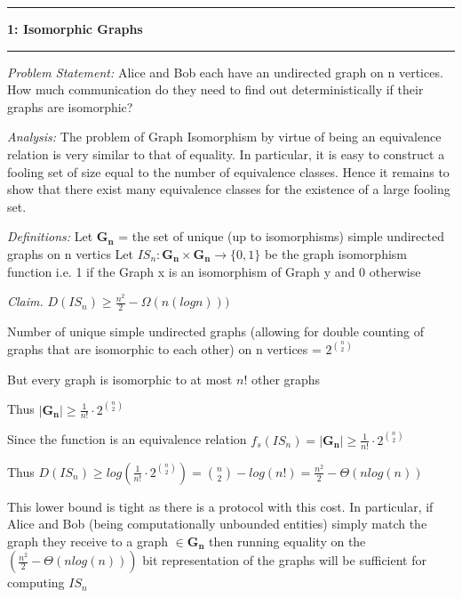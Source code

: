 \documentclass[11pt]{article}
\newcommand\question[2]{\vspace{.25in}\hrule\textbf{#1: #2}\vspace{.5em}\hrule\vspace{.10in}}
\newcommand\analysis{\vspace{.10in}\emph{Analysis: }\newline}
\newcommand\problem{\emph{Problem Statement:}\newline}
\newcommand\definitions{\emph{Definitions:}\newline}
\newcommand\claim{\emph{Claim.}\newline}
\begin{document}
\raggedright
\newcommand\NAME{Siddharth Joshi}  %
\newcommand\HWNUM{}              %


\question{1}{Isomorphic Graphs} 

\problem
Alice and Bob each have an undirected graph on n
vertices. How much communication do they need to find out deterministically if
their graphs are isomorphic?

\analysis
The problem of Graph Isomorphism by virtue of being an equivalence relation is very similar to that of equality. In particular, it is easy to construct a fooling set of size equal to the number of equivalence classes. Hence it remains to show that there exist many equivalence classes for the existence of a large fooling set. \newline

\definitions
Let $\mathbf{G_n}$ = the set of unique (up to isomorphisms) simple undirected graphs on n vertics \newline
Let $IS_n: \mathbf{G_n} \times \mathbf{G_n} \to \{0, 1\}$ be the graph isomorphism function i.e. 1 if the Graph x is an isomorphism of Graph y and 0 otherwise
\newline

\claim
$ D(IS_n) \geq \frac{n^2}{2} - \Omega(n(logn))) $

\proof 
Number of unique simple undirected graphs (allowing for double counting of graphs that are isomorphic to each other) on n vertices = $2^{n \choose 2}$

But every graph is isomorphic to at most $n!$ other graphs

Thus $\vert\mathbf{G_n}\vert \geq \frac{1}{n!} \cdot 2^{{n \choose 2}}$

Since the function is an equivalence relation $f_s(IS_n) = \vert\mathbf{G_n}\vert \geq \frac{1}{n!} \cdot 2^{{n \choose 2}}$

Thus $D(IS_n) \geq log( \frac{1}{n!} \cdot 2^{{n \choose 2}}) = {n \choose 2} - log(n!) = \frac{n^2}{2} - \Theta({nlog(n)})$

This lower bound is tight as there is a protocol with this cost. In particular, if Alice and Bob (being computationally unbounded entities) simply match the graph they receive to a graph $\in \mathbf{G_n}$ then running equality on the $(\frac{n^2}{2} - \Theta({nlog(n)}))$ bit representation of the graphs will be sufficient for computing $IS_n$
\end{document}
